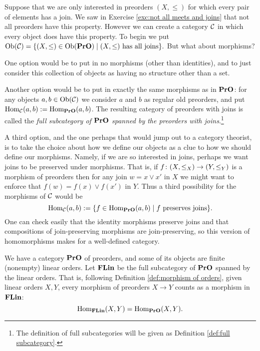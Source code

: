 \documentclass[CT4S-EN-RU]{subfiles}
\begin{document}
\begin{exampleENG}\label{ex:preorders with joins}
Suppose that we are only interested in preorders $(X,\leq)$ for which every pair of elements has a join. We saw in Exercise \ref{exc:not all meets and joins} that not all preorders have this property. However we can create a category $\mathcal{C}$ in which every object does have this property. To begin we put $\textnormal{Ob}(\mathcal{C})=\{(X,\leq)\in\textnormal{Ob}({\bf PrO}){\;|\;} (X,\leq)\textnormal{ has all joins}\}.$ But what about morphisms?

One option would be to put in no morphisms (other than identities), and to just consider this collection of objects as having no structure other than a set.

Another option would be to put in exactly the same morphisms as in ${\bf PrO}$: for any objects $a,b\in\textnormal{Ob}(\mathcal{C})$ we consider $a$ and $b$ as regular old preorders, and put $\textnormal{Hom}_\mathcal{C}(a,b):=\textnormal{Hom}_{{\bf PrO}}(a,b)$. The resulting category of preorders with joins is called the {\em full subcategory of ${\bf PrO}$ spanned by the preorders with joins}.\footnote{The definition of full subcategories will be given as Definition \ref{def:full subcategory}.}

A third option, and the one perhaps that would jump out to a category theorist, is to take the choice about how we define our objects as a clue to how we should define our morphisms. Namely, if we are so interested in joins, perhaps we want joins to be preserved under morphisms. That is, if $f\colon (X,\leq_X)\rightarrow (Y,\leq_Y)$ is a morphism of preorders then for any join $w=x\vee x'$ in $X$ we might want to enforce that $f(w)=f(x)\vee f(x')$ in $Y$. Thus a third possibility for the morphisms of $\mathcal{C}$ would be $$\textnormal{Hom}_\mathcal{C}(a,b):=\{f\in\textnormal{Hom}_{{\bf PrO}}(a,b){\;|\;}f \textnormal{ preserves joins}\}.$$ One can check easily that the identity morphisms preserve joins and that compositions of join-preserving morphisms are join-preserving, so this version of homomorphisms makes for a well-defined category.
\end{exampleENG}

\begin{exampleRUS}\label{ex:preorders with joins}
\end{exampleRUS}

\begin{exampleENG}\label{ex:FLin}
We have a category ${\bf PrO}$ of preorders, and some of its objects are finite (nonempty) linear orders. Let ${\bf FLin}$ be the full subcategory of ${\bf PrO}$ spanned by the linear orders. That is, following Definition \ref{def:morphism of orders}, given linear orders $X,Y$, every morphism of preorders $X\to Y$ counts as a morphism in ${\bf FLin}$: $$\textnormal{Hom}_{\bf FLin}(X,Y)=\textnormal{Hom}_{\bf PrO}(X,Y).$$ 
\end{exampleENG}
\end{document}
